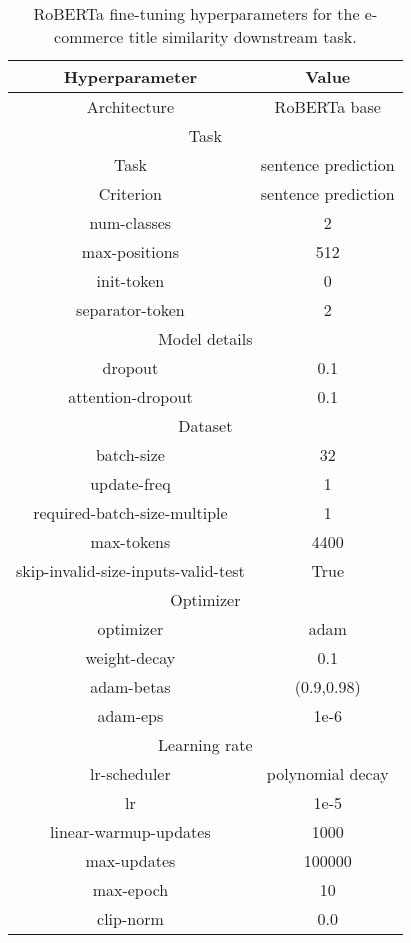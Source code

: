 \begin{table}[!h]
	\caption{RoBERTa fine-tuning hyperparameters for the e-commerce title similarity downstream task.}
	\label{tab:roberta_finetune_esimilarity}
	\begin{center}
		\begin{tabular}{|c|c|}
			\hline
			Hyperparameter\cellcolor[gray]{0.6} & Value \cellcolor[gray]{0.6} \\ \hline
Architecture & RoBERTa base \\ \hline 
\multicolumn{2}{|c|}{\cellcolor[gray]{0.9} Task}\\ \hline 
Task& sentence prediction \\ \hline 
Criterion & sentence prediction \\ \hline 
num-classes & 2 \\ \hline 
max-positions & 512 \\ \hline
init-token & 0  \\ \hline 
separator-token & 2  \\ \hline 
\multicolumn{2}{|c|}{\cellcolor[gray]{0.9} Model details}\\ \hline 
dropout & 0.1 \\ \hline 
attention-dropout & 0.1 \\ \hline 
\multicolumn{2}{|c|}{\cellcolor[gray]{0.9} Dataset}\\ \hline 
batch-size & 32 \\ \hline 
update-freq & 1 \\ \hline 
required-batch-size-multiple & 1 \\ \hline
max-tokens & 4400 \\ \hline
skip-invalid-size-inputs-valid-test & True \\ \hline
\multicolumn{2}{|c|}{\cellcolor[gray]{0.9} Optimizer } \\ \hline 
optimizer &adam \\ \hline 
weight-decay & 0.1 \\ \hline 
adam-betas & (0.9,0.98) \\ \hline 
adam-eps & 1e-6 \\ \hline 
\multicolumn{2}{|c|}{\cellcolor[gray]{0.9} Learning rate} \\ \hline 
lr-scheduler & polynomial decay \\ \hline 
lr & 1e-5 \\ \hline 
linear-warmup-updates & 1000 \\ \hline 
max-updates & 100000 \\ \hline 
max-epoch & 10 \\ \hline
clip-norm & 0.0 \\ \hline 
		\end{tabular}
	\end{center}
\end{table}